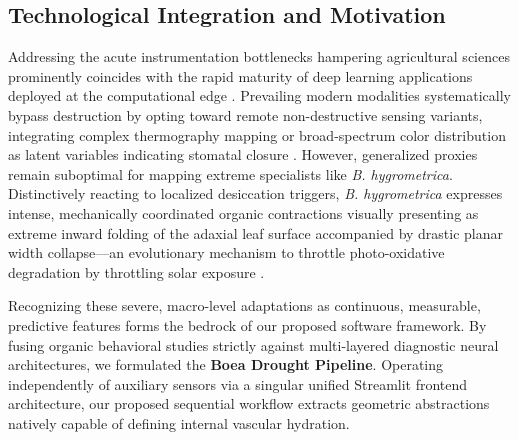 \documentclass[conference]{IEEEtran}
\begin{document}
\subsection{Technological Integration and Motivation}
Addressing the acute instrumentation bottlenecks hampering agricultural sciences prominently coincides with the rapid maturity of deep learning applications deployed at the computational edge \cite{singh2018}. Prevailing modern modalities systematically bypass destruction by opting toward remote non-destructive sensing variants, integrating complex thermography mapping or broad-spectrum color distribution as latent variables indicating stomatal closure \cite{plantcv}. However, generalized proxies remain suboptimal for mapping extreme specialists like \textit{B. hygrometrica}. Distinctively reacting to localized desiccation triggers, \textit{B. hygrometrica} expresses intense, mechanically coordinated organic contractions visually presenting as extreme inward folding of the adaxial leaf surface accompanied by drastic planar width collapse—an evolutionary mechanism to throttle photo-oxidative degradation by throttling solar exposure \cite{gechev}.

Recognizing these severe, macro-level adaptations as continuous, measurable, predictive features forms the bedrock of our proposed software framework. By fusing organic behavioral studies strictly against multi-layered diagnostic neural architectures, we formulated the \textbf{Boea Drought Pipeline}. Operating independently of auxiliary sensors via a singular unified Streamlit frontend architecture, our proposed sequential workflow extracts geometric abstractions natively capable of defining internal vascular hydration.
\end{document}
